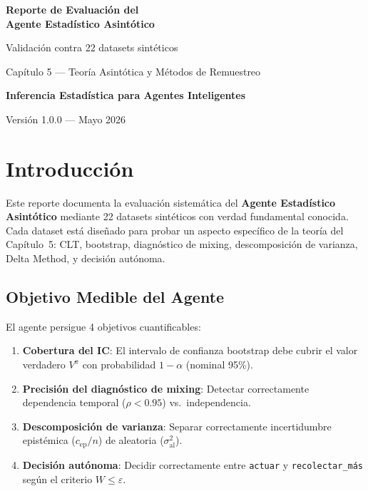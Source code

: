 \documentclass[12pt,a4paper]{article}
\begin{document}
\begin{titlepage}
    \centering
    \vspace*{3cm}
    {\Huge\bfseries Reporte de Evaluación del\\Agente Estadístico Asintótico\par}
    \vspace{0.5cm}
    {\Large Validación contra 22 datasets sintéticos\par}
    \vspace{1.5cm}
    {\large Capítulo 5 --- Teoría Asintótica y Métodos de Remuestreo\par}
    \vspace{1cm}
    {\large\bfseries Inferencia Estadística para Agentes Inteligentes\par}
    \vspace{2cm}
    {\large Versión 1.0.0 --- Mayo 2026\par}
    \vfill
\end{titlepage}

\tableofcontents
\newpage

\section{Introducción}

Este reporte documenta la evaluación sistemática del \textbf{Agente Estadístico Asintótico} mediante 22 datasets sintéticos con verdad fundamental conocida. Cada dataset está diseñado para probar un aspecto específico de la teoría del Capítulo~5: CLT, bootstrap, diagnóstico de mixing, descomposición de varianza, Delta Method, y decisión autónoma.

\subsection{Objetivo Medible del Agente}

El agente persigue 4 objetivos cuantificables:

\begin{enumerate}
    \item \textbf{Cobertura del IC}: El intervalo de confianza bootstrap debe cubrir el valor verdadero $V^{\pi}$ con probabilidad $1 - \alpha$ (nominal 95\%).
    \item \textbf{Precisión del diagnóstico de mixing}: Detectar correctamente dependencia temporal ($\rho < 0.95$) vs.\ independencia.
    \item \textbf{Descomposición de varianza}: Separar correctamente incertidumbre epistémica ($c_{\text{ep}}/n$) de aleatoria ($\sigma^2_{\text{al}}$).
    \item \textbf{Decisión autónoma}: Decidir correctamente entre \texttt{actuar} y \texttt{recolectar\_más} según el criterio $W \leq \varepsilon$.
\end{enumerate}
\end{document}

